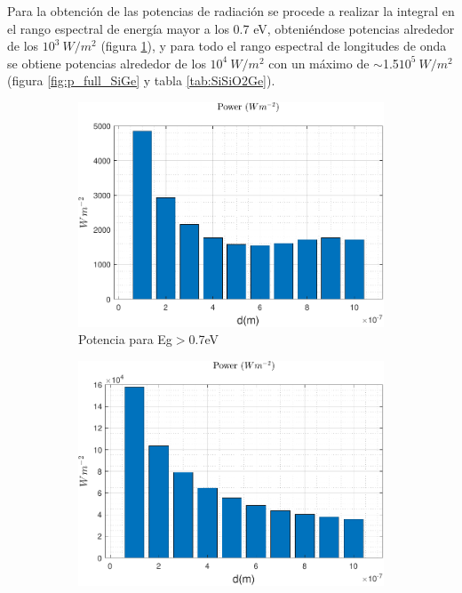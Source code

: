 Para la obtención de las potencias de radiación se procede a realizar la integral en el rango espectral de energía mayor a los 0.7 eV, obteniéndose potencias alrededor de los $10^3 \ W/m^2$ (figura \ref{fig:p_Eg_SiGe}), y para todo el rango espectral de longitudes de onda se obtiene potencias alrededor de los $10^4 \ W/m^2$ con un máximo de $\sim$1.5$10^5 \ W/m^2$ (figura \ref{fig:p_full_SiGe} y tabla \ref{tab:SiSiO2Ge}). 
\begin{figure}[H]
\centering
\begin{subfigure}[b]{0.49\textwidth}
	\centering
		\includegraphics[width=1.00\textwidth]{figuras/Resultados/radiacion/p_Eg_SiGe.pdf}
	\caption{Potencia para Eg$>$0.7eV}
	\label{fig:p_Eg_SiGe}
\end{subfigure}
\hfill
\begin{subfigure}[b]{0.49\textwidth}
	\centering
		\includegraphics[width=1.00\textwidth]{figuras/Resultados/radiacion/p_full_SiGe.pdf}

\end{subfigure}
\end{figure}
